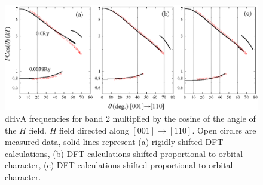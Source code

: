 \begin{figure}[htbp]
    \begin{center}
        \includegraphics[scale=0.8]{Chapter-dHvABaFe2P2/Figures/AngleDepMeasurements/BandCharacterRotPlot/Band2_110_RotPlot_Comparison}
        \caption{dHvA frequencies for band 2 multiplied by the cosine of the angle of the $H$ field. $H$ field directed along $[001]\rightarrow[110]$. Open circles are measured data, solid lines represent (a) rigidly shifted \ac{DFT} calculations, (b) \ac{DFT} calculations shifted proportional to \DzTwo{} orbital character, (c) \ac{DFT} calculations shifted proportional to \DxzDyz{} orbital character.}
        \label{Fig:ResD:Band2DCharacterRigidComparison}
    \end{center}
\end{figure}

